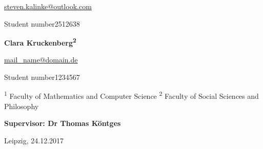 \begin{titlepage}
\begin{center}
\begin{minipage}[t]{.6\textwidth}
		\begin{normalsize}
			\href{mailto:steven.kalinke@outlook.com}{steven.kalinke@outlook.com}
			
			\libertineLF
			{\footnotesize Student number\enspace{}2512638} \vspace*{1cm}
		\end{normalsize}
	\end{minipage}%
	\begin{minipage}[t]{.4\textwidth}
		\large{\textbf{Clara Kruckenberg\textsuperscript{2}}} \vspace*{0.3cm}
		
		\begin{normalsize}
			\href{mailto:mail_name@domain.de}{mail\_name@domain.de} %
			
			\libertineLF
			{\footnotesize Student number\enspace{}1234567} \vspace*{0.1cm}
		\end{normalsize}
	\end{minipage}


	\end{center}


	\noindent
	{\footnotesize \textsuperscript{1} Faculty of Mathematics and Computer Science \quad{}\textsuperscript{2} Faculty of Social Sciences and Philosophy} \vspace*{1cm}
	
	\noindent
	\textbf{{\large Supervisor: Dr Thomas Köntges}} \vspace*{0.5cm}
	
	\noindent
	{\small Leipzig, 24.12.2017}
	
	
\end{titlepage}